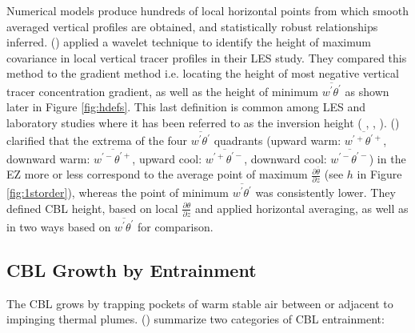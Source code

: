 Numerical models produce hundreds of local horizontal points from which smooth averaged vertical profiles are obtained, and statistically robust relationships inferred. \citeauthor{BrooksFowler2} (\citeyear{BrooksFowler2}) applied a wavelet technique to identify the height of maximum covariance in local vertical tracer profiles in their \acs{LES} study.  They compared this method to the gradient method i.e. locating the height of most negative vertical tracer concentration gradient, as well as the height of minimum $\overline{w^{'}\theta^{'}}$ as shown later in Figure \ref{fig:hdefs}.  This last definition is common among \acs{LES} and laboratory studies where it has been referred to as the inversion height (\citeauthor{DearWill80} \citeyear{DearWill80}, \citeauthor{Sorbjan1} \citeyear{Sorbjan1}, \citeauthor{FedConzMir04} \citeyear{FedConzMir04}).  \citeauthor{SullMoengStev} (\citeyear{SullMoengStev}) clarified that the extrema of the four $\overline{w^{'}\theta^{'}}$ quadrants (upward warm: $\overline{w^{'+}\theta^{'+}}$, downward warm: $\overline{w^{'-}\theta^{'+}}$, upward cool: $\overline{w^{'+}\theta^{'-}}$, downward cool: $\overline{w^{'-}\theta^{'-}}$) in the \acs{EZ} more or less correspond to the average point of maximum $\frac{\partial \overline{\theta}}{\partial z}$ (see $h$ in Figure \ref{fig:1storder}), whereas the point of minimum $\overline{w^{'}\theta^{'}}$ was consistently lower. They defined \acs{CBL} height, based on local $\frac{\partial \theta}{\partial z}$ and applied horizontal averaging, as well as in two ways based on $\overline{w^{'}\theta^{'}}$ for comparison.\\


\subsection{CBL Growth by Entrainment}
\label{subsec:cblgrowth}

The \acs{CBL} grows by trapping pockets of warm stable air between
or adjacent to impinging thermal plumes.  \citeauthor{Traum11} (\citeyear{Traum11}) summarize two categories of \acs{CBL} entrainment:\\

